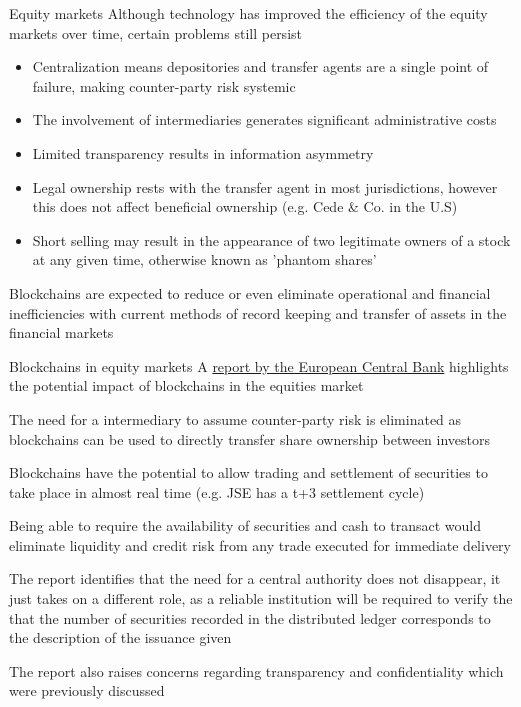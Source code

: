 \documentclass[11pt]{beamer}
\begin{document}
\begin{frame}{Equity markets}
	Although technology has improved the efficiency of the equity markets over time, certain problems still persist
	\begin{itemize}
		\item Centralization means depositories and transfer agents are a single point of failure, making counter-party risk systemic
		\item The involvement of intermediaries generates significant administrative costs
		\item Limited transparency results in information asymmetry
		\item Legal ownership rests with the transfer agent in most jurisdictions, however this does not affect beneficial ownership (e.g. Cede \& Co. in the U.S)
		\item Short selling may result in the appearance of two legitimate owners of a stock at any given time, otherwise known as 'phantom shares'
	\end{itemize}
	Blockchains are expected to reduce or even eliminate operational and financial inefficiencies with current methods of record keeping and transfer of assets in the financial markets
\end{frame}


\begin{frame}{Blockchains in equity markets}
	A \href{https://www.ecb.europa.eu/pub/pdf/scpops/ecbop172.en.pdf}{report by the European Central Bank} highlights the potential impact of blockchains in the equities market
	\begin{itemize}
	\end{itemize}
\end{frame}
\end{document}
